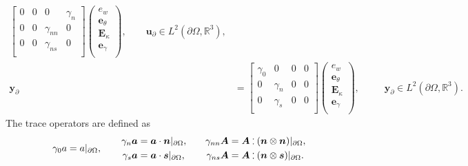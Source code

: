 \begin{subequations}
\begin{align}
	\begin{bmatrix}
	{0} &  {0} & {0} & \gamma_{n} \\
	{0} &  {0} & \gamma_{nn} & {0} \\
	{0} &  {0} & \gamma_{ns} & {0} \\
	\end{bmatrix}
\begin{pmatrix}
e_w \\
\bm{e}_{\theta} \\
\bm{E}_{\kappa} \\
\bm{e}_{\gamma} \\
\end{pmatrix}, \qquad \bm{u}_\partial \in L^2(\partial\Omega, \mathbb{R}^3), \\
\bm{y}_\partial &= 
	\begin{bmatrix}
	\gamma_{0} & {0} & {0} & {0} \\
	{0} & \gamma_{n} & {0} & {0} \\
	{0} & \gamma_{s} & {0} & {0} \\
	\end{bmatrix}
\begin{pmatrix}
e_w \\
\bm{e}_{\theta} \\
\bm{E}_{\kappa} \\
\bm{e}_{\gamma} \\
\end{pmatrix}, \qquad\;\; \bm{y}_\partial \in L^2(\partial\Omega, \mathbb{R}^3).
\end{align}
\end{subequations}
The trace operators are defined as
\begin{equation}
\gamma_{0}a = a\vert_{\partial\Omega}, \qquad
\begin{aligned}
\gamma_{n}\bm{a} &= \bm{a} \cdot \bm{n}\vert_{\partial\Omega}, \\
\gamma_{s}\bm{a} &= \bm{a} \cdot \bm{s}\vert_{\partial\Omega},
\end{aligned}  \qquad 
\begin{aligned}
\gamma_{nn}\bm{A} &= \bm{A} \cddot (\bm{n} \otimes \bm{n})\vert_{\partial\Omega}, \\
\gamma_{ns}\bm{A} &= \bm{A} \cddot (\bm{n} \otimes \bm{s})\vert_{\partial\Omega}.
\end{aligned}
\end{equation}

